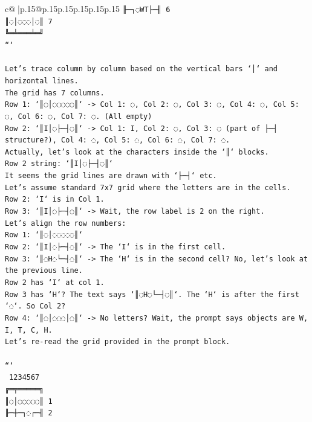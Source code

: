 \documentclass{article}
\begin{document}
{\begin{supertabular}{c@{$\;$}|p{.15\linewidth}@{}p{.15\linewidth}p{.15\linewidth}p{.15\linewidth}p{.15\linewidth}p{.15\linewidth}}
{{{\texttt{╟─┐◌WT├─╢ 6} \\
\texttt{║◌│◌◌◌│◌║ 7} \\
\texttt{╚═╧═══╧═╝} \\
\texttt{```} \\
\\ 
\texttt{Let's trace column by column based on the vertical bars `│` and horizontal lines.} \\
\texttt{The grid has 7 columns.} \\
\texttt{Row 1: `║◌│◌◌◌◌◌║` {-}> Col 1: ◌, Col 2: ◌, Col 3: ◌, Col 4: ◌, Col 5: ◌, Col 6: ◌, Col 7: ◌. (All empty)} \\
\texttt{Row 2: `║I│◌├─┤◌║` {-}> Col 1: I, Col 2: ◌, Col 3: ◌ (part of ├─┤ structure?), Col 4: ◌, Col 5: ◌, Col 6: ◌, Col 7: ◌.} \\
\texttt{Actually, let's look at the characters inside the `║` blocks.} \\
\texttt{Row 2 string: `║I│◌├─┤◌║`} \\
\texttt{It seems the grid lines are drawn with `├─┤` etc.} \\
\texttt{Let's assume standard 7x7 grid where the letters are in the cells.} \\
\texttt{Row 2: `I` is in Col 1.} \\
\texttt{Row 3: `║I│◌├─┤◌║` {-}> Wait, the row label is 2 on the right.} \\
\texttt{Let's align the row numbers:} \\
\texttt{Row 1: `║◌│◌◌◌◌◌║`} \\
\texttt{Row 2: `║I│◌├─┤◌║` {-}> The `I` is in the first cell.} \\
\texttt{Row 3: `║◌H◌└─┤◌║` {-}> The `H` is in the second cell? No, let's look at the previous line.} \\
\texttt{Row 2 has `I` at col 1.} \\
\texttt{Row 3 has `H`? The text says `║◌H◌└─┤◌║`. The `H` is after the first `◌`. So Col 2?} \\
\texttt{Row 4: `║◌│◌◌◌│◌║` {-}> No letters? Wait, the prompt says objects are W, I, T, C, H.} \\
\texttt{Let's re{-}read the grid provided in the prompt block.} \\
\\ 
\texttt{```} \\
\texttt{ 1234567} \\
\texttt{╔═╤═════╗} \\
\texttt{║◌│◌◌◌◌◌║ 1} \\
\texttt{╟─┼─┐◌┌─╢ 2} \\
}}}
\end{supertabular}}
\end{document}
